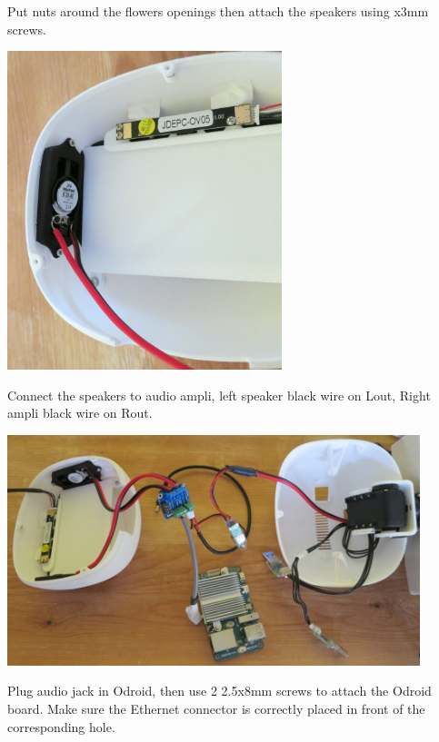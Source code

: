 \documentclass[includefoot]{article}
\begin{document}
\newpage

Put  nuts around the flowers openings then attach the speakers using  x3mm screws.

\begin{center}
  \includegraphics[width=0.6\textwidth]{img/head_speaker}
 \end{center}

Connect the speakers to audio ampli, left speaker black wire on Lout, Right ampli black wire on Rout.

 \begin{center}
  \includegraphics[width=0.9\textwidth]{img/head_wiring2}
 \end{center}

Plug audio jack in Odroid, then use 2 \diameter 2.5x8mm screws to attach the Odroid board. Make sure the Ethernet connector is correctly placed in front of the corresponding hole.
\end{document}
